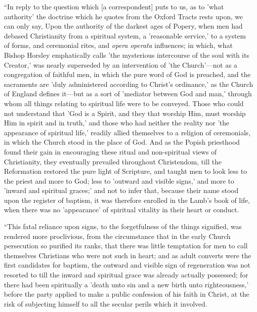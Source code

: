 ``In reply to the question which [a correspondent]
puts to us, as to 'what authority' the doctrine which he quotes from
the Oxford Tracts rests upon, we can only say, Upon the authority of
the darkest ages of Popery, when men had debased Christianity from a
spiritual system, a 'reasonable service,' to a system of forms, and
ceremonial rites, and \emph{opera operata} influences; in which, what
Bishop Horsley emphatically calls 'the mysterious intercourse of the
soul with its Creator,' was nearly superseded by an intervention of
'the Church'—not as a congregation of faithful men, in which the
pure word of God is preached, and the sacraments are 'duly
administered according to Christ's ordinance,' as the Church of
England defines it—but as a sort of 'mediator between God and man,'
through whom all things relating to spiritual life were to be
conveyed. Those who could not understand that 'God is a Spirit, and
they that worship Him, must worship Him in spirit and in truth,' and
those who had neither the reality nor 'the appearance of spiritual
life,' readily allied themselves to a religion of ceremonials, in
which the Church stood in the place of God. And as the Popish
priesthood found their gain in encouraging these ritual and
non-spiritual views of Christianity, they eventually prevailed
throughout Christendom, till the Reformation restored the pure light
of Scripture, and taught men to look less to the priest and more to
God; less to 'outward and visible signs,' and more to 'inward and
spiritual graces;' and not to infer that, because their name stood
upon the register of baptism, it was therefore enrolled in the Lamb's
book of life, when there was no 'appearance' of spiritual vitality in
their heart or conduct.

``This fatal reliance upon signs, to the
forgetfulness of the things signified, was rendered more proclivious,
from the circumstance that in the early Church persecution so purified
its ranks, that there was little temptation for men to call themselves
Christians who were not such in heart; and as adult converts were the
first candidates for baptism, the outward and visible sign of
regeneration was not resorted to till the inward and spiritual grace
was already actually possessed; for there had been spiritually a
'death unto sin and a new birth unto righteousness,' before the party
applied to make a public confession of his faith in Christ, at the
risk of subjecting himself to all the secular perils which it
involved.

